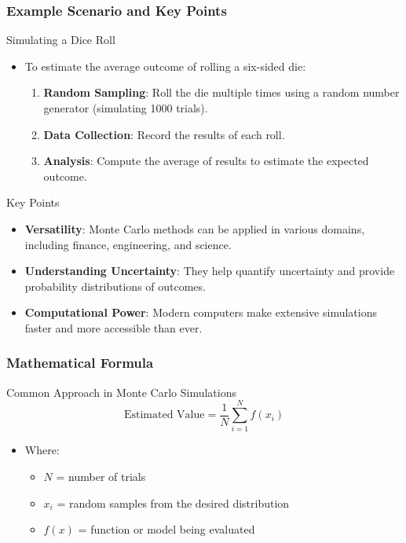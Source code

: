 \documentclass[aspectratio=169]{beamer}
\begin{document}
\begin{frame}[fragile]
  \frametitle{Example Scenario and Key Points}
  \begin{block}{Simulating a Dice Roll}
    \begin{itemize}
      \item To estimate the average outcome of rolling a six-sided die:
        \begin{enumerate}
          \item \textbf{Random Sampling}: Roll the die multiple times using a random number generator (simulating 1000 trials).
          \item \textbf{Data Collection}: Record the results of each roll.
          \item \textbf{Analysis}: Compute the average of results to estimate the expected outcome.
        \end{enumerate}
    \end{itemize}
  \end{block}

  \begin{block}{Key Points}
    \begin{itemize}
      \item \textbf{Versatility}: Monte Carlo methods can be applied in various domains, including finance, engineering, and science.
      \item \textbf{Understanding Uncertainty}: They help quantify uncertainty and provide probability distributions of outcomes.
      \item \textbf{Computational Power}: Modern computers make extensive simulations faster and more accessible than ever.
    \end{itemize}
  \end{block}
\end{frame}

\begin{frame}[fragile]
  \frametitle{Mathematical Formula}
  \begin{block}{Common Approach in Monte Carlo Simulations}
    \begin{equation}
      \text{Estimated Value} = \frac{1}{N} \sum_{i=1}^{N} f(x_i)
    \end{equation}
    \vspace{-0.5cm} %
    \begin{itemize}
      \item Where:
      \begin{itemize}
        \item \( N \) = number of trials
        \item \( x_i \) = random samples from the desired distribution
        \item \( f(x) \) = function or model being evaluated
      \end{itemize}
    \end{itemize}
  \end{block}
\end{frame}
\end{document}
